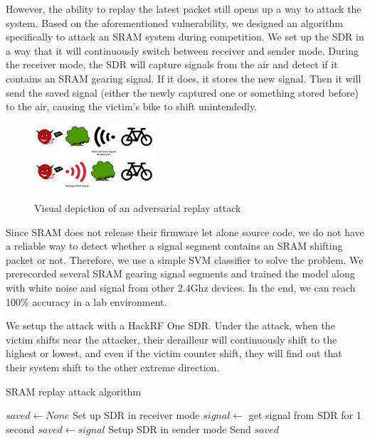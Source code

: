 \documentclass[letterpaper,twocolumn,10pt]{article}
\begin{document}
However, the ability to replay the latest packet still opens up a way to attack the system. Based on the aforementioned vulnerability, we designed an algorithm specifically to attack an SRAM system during competition. We set up the SDR in a way that it will continuously switch between receiver and sender mode. During the receiver mode, the SDR will capture signals from the air and detect if it contains an SRAM gearing signal. If it does, it stores the new signal. Then it will send the saved signal (either the newly captured one or something stored before) to the air, causing the victim's bike to shift unintendedly. 



\begin{figure}[ht]
  \begin{center}
    \centering
    \includegraphics[width=0.4\textwidth]{images/replay.png}
    \label{fig:Replay}
  \end{center}
  \caption{Visual depiction of an adversarial replay attack}
\end{figure}

Since SRAM does not release their firmware let alone source code, we do not have a reliable way to detect whether a signal segment contains an SRAM shifting packet or not. Therefore, we use a simple SVM classifier to solve the problem. We prerecorded several SRAM gearing signal segments and trained the model along with white noise and signal from other 2.4Ghz devices. In the end, we can reach 100\% accuracy in a lab environment.

We setup the attack with a HackRF One SDR. Under the attack, when the victim shifts near the attacker, their derailleur will continuously shift to the highest or lowest, and even if the victim counter shift, they will find out that their system shift to the other extreme direction.
\begin{algorithm}
\caption{SRAM replay attack algorithm}\label{alg:cap}
\begin{algorithmic}[1]
  \State $saved \gets None$
    \State Set up SDR in receiver mode
    \State $signal \gets$ get signal from SDR for 1 second
        \State $saved \gets signal$
    \State Setup SDR in sender mode
    \State Send $saved$
    \EndIf 
  \EndWhile
  \end{algorithmic}
\end{algorithm}
\end{document}
